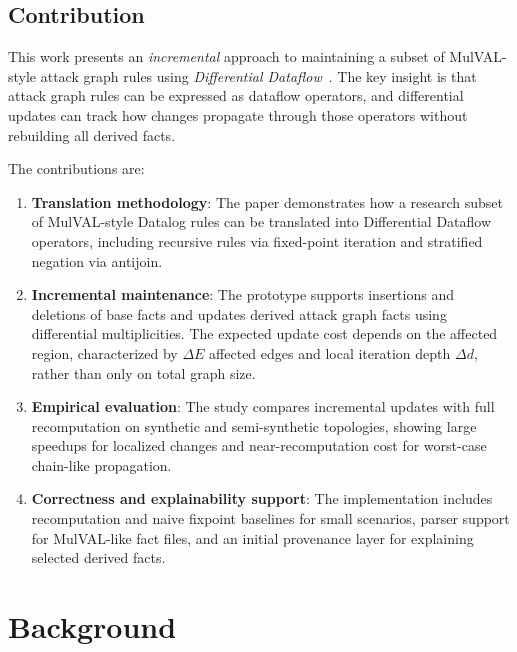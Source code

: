 \documentclass[conference]{IEEEtran}
\begin{document}
\subsection{Contribution}

This work presents an \textit{incremental} approach to maintaining a subset of MulVAL-style attack graph rules using \textit{Differential Dataflow}~\cite{mcsherry2013differential}. The key insight is that attack graph rules can be expressed as dataflow operators, and differential updates can track how changes propagate through those operators without rebuilding all derived facts.

The contributions are:

\begin{enumerate}
    \item \textbf{Translation methodology}: The paper demonstrates how a research subset of MulVAL-style Datalog rules can be translated into Differential Dataflow operators, including recursive rules via fixed-point iteration and stratified negation via antijoin.
    
    \item \textbf{Incremental maintenance}: The prototype supports insertions and deletions of base facts and updates derived attack graph facts using differential multiplicities. The expected update cost depends on the affected region, characterized by $\Delta E$ affected edges and local iteration depth $\Delta d$, rather than only on total graph size.
    
    \item \textbf{Empirical evaluation}: The study compares incremental updates with full recomputation on synthetic and semi-synthetic topologies, showing large speedups for localized changes and near-recomputation cost for worst-case chain-like propagation.
    
    \item \textbf{Correctness and explainability support}: The implementation includes recomputation and naive fixpoint baselines for small scenarios, parser support for MulVAL-like fact files, and an initial provenance layer for explaining selected derived facts.
\end{enumerate}

\section{Background}
\end{document}
